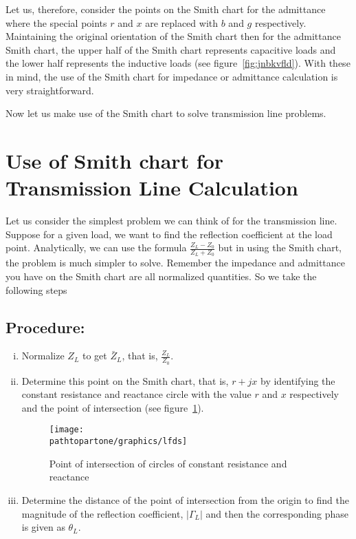 Let us, therefore, consider the points on the Smith chart for the admittance where the special points $r$ and $x$ are replaced with $b$ and $g$ respectively. Maintaining the original orientation of the Smith chart then for the admittance Smith chart, the upper half of the Smith chart represents capacitive loads and the lower half represents the inductive loads (see figure~\ref{fig:jnbkvfld}). With these in mind, the use of the Smith chart for impedance or admittance calculation is very straightforward.

Now let us make use of the Smith chart to solve transmission line problems. 

\section{Use of Smith chart for Transmission Line Calculation}
Let us consider the simplest problem we can think of for the transmission line. Suppose for a given load, we want to find the reflection coefficient at the load point. Analytically, we can use the formula $\frac{Z_L - Z_0}{Z_L + Z_0}$ but in using the Smith chart, the problem is much simpler to solve. Remember the impedance and admittance you have on the Smith chart are all normalized quantities. So we take the following steps

\subsection*{Procedure:}
\begin{enumerate}[(i)]
\item Normalize $Z_{L}$ to get $\bar{Z}_{L}$, that is, $\frac{Z_{L}}{Z_{0}}$.
\item Determine this point on the Smith chart, that is, $r+jx$ by identifying the constant resistance and reactance circle with the value $r$ and $x$ respectively and the point of intersection (see figure~\ref{fig:lfds}).
\begin{figure}[h]
\centering
\texttt{[image: \\pathtopartone/graphics/lfds]}
\caption{Point of intersection of circles of constant resistance and reactance}
\label{fig:lfds}
\end{figure}

\item Determine the distance of the point of intersection from the origin to find the magnitude of the reflection coefficient, $|\Gamma_L|$ and then the corresponding phase is given as $\theta_L$.
\end{enumerate}


